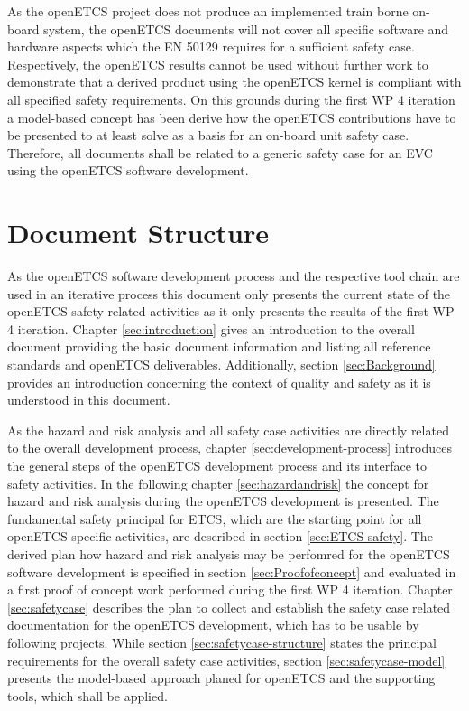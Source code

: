\documentclass{template/openetcs_report}
\begin{document}
As the openETCS project does not produce an implemented train borne on-board system, the openETCS documents will not cover all specific software and hardware aspects which the EN 50129 requires for a sufficient safety case. Respectively, the openETCS results cannot be used without further work to demonstrate that a derived product using the openETCS kernel is compliant with all specified safety requirements. On this grounds during the first WP 4 iteration a model-based concept has been derive how the openETCS contributions have to be presented to at least solve as a basis for an on-board unit safety case. Therefore, all documents shall be related to a generic safety case for an EVC using the openETCS software development.

\section{Document Structure}
\label{sec:document-structure}

As the openETCS software development process and the respective tool chain are used in an iterative process this document only presents the current state of the openETCS safety related activities as it only presents the results of the first WP 4 iteration. Chapter \ref{sec:introduction} gives an introduction to the overall document providing the basic document information and listing all reference standards and openETCS deliverables. Additionally, section \ref{sec:Background} provides an introduction concerning the context of quality and safety as it is understood in this document.

As the hazard and risk analysis and all safety case activities are directly related to the overall development process, chapter \ref{sec:development-process} introduces the general steps of the openETCS development process and its interface to safety activities. In the following chapter \ref{sec:hazardandrisk} the concept for hazard and risk analysis during the openETCS development is presented. The fundamental safety principal for ETCS, which are the starting point for all openETCS specific activities, are described in section \ref{sec:ETCS-safety}.
The derived plan how hazard and risk analysis may be perfomred for the openETCS software development is specified in section \ref{sec:Proofofconcept} and evaluated in a first proof of concept work performed during the first WP 4 iteration. Chapter \ref{sec:safetycase} describes the plan to collect and establish the safety case related documentation for the openETCS development, which has to be usable by following projects. While section \ref{sec:safetycase-structure} states the principal requirements for the overall safety case activities, section \ref{sec:safetycase-model} presents the model-based approach planed for openETCS and the supporting tools, which shall be applied.
\end{document}
